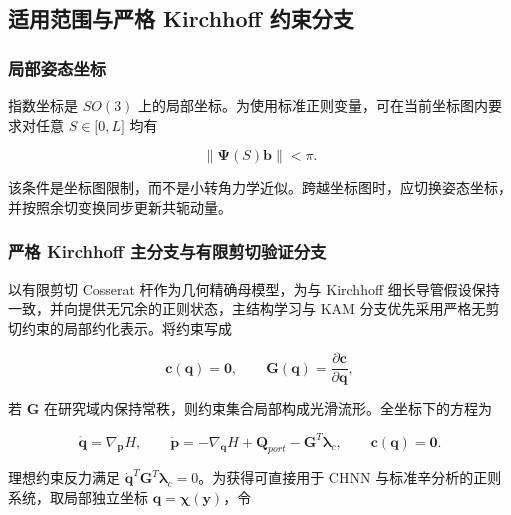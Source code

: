 \subsection{适用范围与严格 Kirchhoff 约束分支}\label{sec:hamiltonian-3-6}

\subsubsection{局部姿态坐标}\label{sec:hamiltonian-3-6-1}

指数坐标是 \(SO(3)\) 上的局部坐标。为使用标准正则变量，可在当前坐标图内要求对任意 \(S \in \lbrack 0,L\rbrack\) 均有

\begin{equation}
\label{eq:hamiltonian-3-61}
\parallel \bm{\Psi}(S)\mathbf{b} \parallel < \pi.
\end{equation}

该条件是坐标图限制，而不是小转角力学近似。跨越坐标图时，应切换姿态坐标，并按照余切变换同步更新共轭动量。

\subsubsection{严格 Kirchhoff 主分支与有限剪切验证分支}\label{sec:hamiltonian-3-6-2}

以有限剪切 Cosserat 杆作为几何精确母模型，为与 Kirchhoff 细长导管假设保持一致，并向提供无冗余的正则状态，主结构学习与 KAM 分支优先采用严格无剪切约束的局部约化表示。将约束写成\cite{MarsdenRatiu1999MechanicsSymmetry,HairerLubichWanner2006GNI}

\begin{equation}
\label{eq:hamiltonian-3-62}
\mathbf{c}\left( \mathbf{q} \right) = \mathbf{0},\quad\quad\mathbf{G}\left( \mathbf{q} \right) = \frac{\partial\mathbf{c}}{\partial\mathbf{q}},
\end{equation}

若 \(\mathbf{G}\) 在研究域内保持常秩，则约束集合局部构成光滑流形。全坐标下的方程为

\begin{equation}
\label{eq:hamiltonian-3-63}
\boxed{\dot{\mathbf{q}} = \nabla_{\mathbf{p}}H,\quad\quad\dot{\mathbf{p}} = - \nabla_{\mathbf{q}}H + \mathbf{Q}_{port} - \mathbf{G}^{T}\bm{\lambda}_{c},\quad\quad\mathbf{c}\left( \mathbf{q} \right) = \mathbf{0}.}
\end{equation}

理想约束反力满足 \({\dot{\mathbf{q}}}^{T}\mathbf{G}^{T}\bm{\lambda}_{c} = 0\)。为获得可直接用于 CHNN 与标准辛分析的正则系统，取局部独立坐标 \(\mathbf{q} = \bm{\chi}\left( \mathbf{y} \right)\)，令

